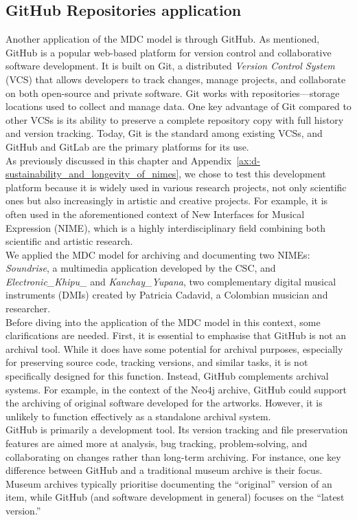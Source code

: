 \subsection{GitHub Repositories application}
Another application of the MDC model is through GitHub. As mentioned, GitHub is a popular web-based platform for version control and collaborative software development. It is built on Git, a distributed \textit{Version Control System} (VCS) that allows developers to track changes, manage projects, and collaborate on both open-source and private software. Git works with repositories—storage locations used to collect and manage data. One key advantage of Git compared to other VCSs is its ability to preserve a complete repository copy with full history and version tracking. Today, Git is the standard among existing VCSs, and GitHub and GitLab are the primary platforms for its use.\\
As previously discussed in this chapter and Appendix~\ref{ax:d-sustainability_and_longevity_of_nimes}, we chose to test this development platform because it is widely used in various research projects, not only scientific ones but also increasingly in artistic and creative projects. For example, it is often used in the aforementioned context of New Interfaces for Musical Expression (NIME), which is a highly interdisciplinary field combining both scientific and artistic research.\\
We applied the MDC model for archiving and documenting two NIMEs: \textit{Soundrise}, a multimedia application developed by the CSC, and \textit{Electronic\_Khipu\_} and \textit{Kanchay\_Yupana}, two complementary digital musical instruments (DMIs) created by Patricia Cadavid, a Colombian musician and researcher.\\
Before diving into the application of the MDC model in this context, some clarifications are needed. First, it is essential to emphasise that GitHub is not an archival tool. While it does have some potential for archival purposes, especially for preserving source code, tracking versions, and similar tasks, it is not specifically designed for this function. Instead, GitHub complements archival systems. For example, in the context of the Neo4j archive, GitHub could support the archiving of original software developed for the artworks. However, it is unlikely to function effectively as a standalone archival system.\\
GitHub is primarily a development tool. Its version tracking and file preservation features are aimed more at analysis, bug tracking, problem-solving, and collaborating on changes rather than long-term archiving. For instance, one key difference between GitHub and a traditional museum archive is their focus. Museum archives typically prioritise documenting the ``original'' version of an item, while GitHub (and software development in general) focuses on the ``latest version.''\\
